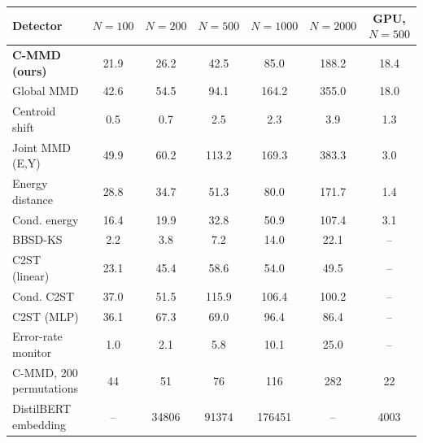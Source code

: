 \setlength{\tabcolsep}{3pt}\renewcommand{\arraystretch}{1.1}%
\begin{tabular}{lccccc|c}
\toprule
Detector & $N{=}100$ & $N{=}200$ & $N{=}500$ & $N{=}1000$ & $N{=}2000$ & GPU, $N{=}500$ \\
\midrule
\textbf{C-MMD (ours)} & 21.9 & 26.2 & 42.5 & 85.0 & 188.2 & 18.4 \\
Global MMD & 42.6 & 54.5 & 94.1 & 164.2 & 355.0 & 18.0 \\
Centroid shift & 0.5 & 0.7 & 2.5 & 2.3 & 3.9 & 1.3 \\
Joint MMD (E,Y) & 49.9 & 60.2 & 113.2 & 169.3 & 383.3 & 3.0 \\
Energy distance & 28.8 & 34.7 & 51.3 & 80.0 & 171.7 & 1.4 \\
Cond. energy & 16.4 & 19.9 & 32.8 & 50.9 & 107.4 & 3.1 \\
BBSD-KS & 2.2 & 3.8 & 7.2 & 14.0 & 22.1 & -- \\
C2ST (linear) & 23.1 & 45.4 & 58.6 & 54.0 & 49.5 & -- \\
Cond. C2ST & 37.0 & 51.5 & 115.9 & 106.4 & 100.2 & -- \\
C2ST (MLP) & 36.1 & 67.3 & 69.0 & 96.4 & 86.4 & -- \\
Error-rate monitor & 1.0 & 2.1 & 5.8 & 10.1 & 25.0 & -- \\
\midrule
C-MMD, 200 permutations & 44 & 51 & 76 & 116 & 282 & 22 \\
DistilBERT embedding & -- & 34806 & 91374 & 176451 & -- & 4003 \\
\bottomrule
\end{tabular}